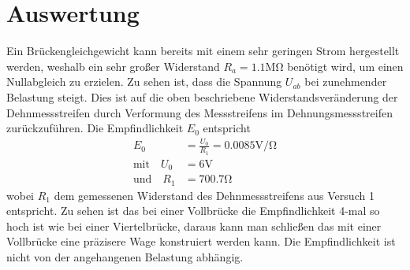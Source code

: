 \newpage

\section[Auswertung]{Auswertung}
Ein Brückengleichgewicht kann bereits mit einem sehr geringen Strom
hergestellt werden, weshalb ein sehr großer Widerstand \( R_a = 1.1 \si{\mega\ohm} \) benötigt wird,
um einen Nullabgleich zu erzielen.
Zu sehen ist, dass die Spannung \( U_{ab} \) bei zunehmender Belastung steigt.
Dies ist auf die oben beschriebene Widerstandsveränderung
der Dehnmessstreifen durch Verformung des Messstreifens
im Dehnungsmessstreifen zurückzuführen.
Die Empfindlichkeit \( E_0 \) entspricht
\begin{align*}
    E_0 &= \frac{ U_0 }{ R_1 } = 0.0085 \si{\volt\per\ohm} \\
    \text{mit} \quad U_0 &= 6 \si{\volt} \\
    \text{und} \quad R_1 &= 700.7 \si{\ohm}
\end{align*}
wobei \( R_1 \) dem gemessenen Widerstand des Dehnmessstreifens aus Versuch 1 entspricht.
Zu sehen ist das bei einer Vollbrücke die Empfindlichkeit 4-mal so hoch ist wie bei einer Viertelbrücke, daraus kann man schließen das mit einer Vollbrücke eine präzisere Wage konstruiert werden kann.
Die Empfindlichkeit ist nicht von der angehangenen Belastung abhängig.